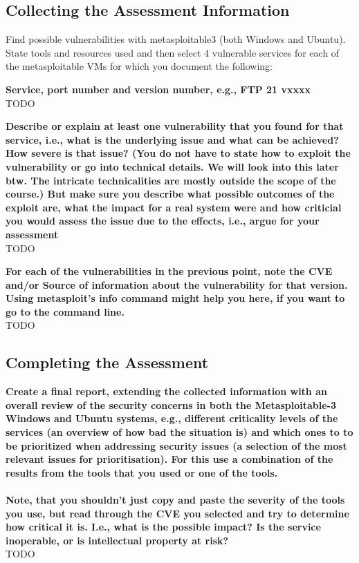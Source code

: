 \subsection*{Collecting the Assessment Information}
Find possible vulnerabilities with metasploitable3 (both Windows and Ubuntu).\\
State tools and resources used and then select 4 vulnerable services for each of the metasploitable VMs for which you document the following:

\textbf{\dag Service, port number and version number, e.g., FTP 21 vxxxx}\\
TODO

\textbf{\dag Describe or explain at least one vulnerability that you found for that service, i.e., what is the underlying issue and what can be achieved? How severe is that issue? (You do not have to state how to exploit the vulnerability or go into technical details. We will look into this later btw. The intricate technicalities are mostly outside the scope of the course.) But make sure you describe what possible outcomes of the exploit are, what the impact for a real system were and how criticial you would assess the issue due to the effects, i.e., argue for your assessment}\\
TODO

\textbf{\dag For each of the vulnerabilities in the previous point, note the CVE and/or Source of information about the vulnerability for that version. Using metasploit’s info command might help you here, if you want to go to the command line.}\\
TODO

\subsection*{Completing the Assessment}
\textbf{\dag
    Create a final report, extending the collected information with an overall review of the security concerns in both the Metasploitable-3 Windows and Ubuntu systems, e.g., different criticality levels of the services (an overview of how bad the situation is) and which ones to to be prioritized when addressing security issues (a selection of the most relevant issues for prioritisation). For this use a combination of the results from the tools that you used or one of the tools.\\\\
    Note, that you shouldn’t just copy and paste the severity of the tools you use, but read through the CVE you selected and try to determine how critical it is. I.e., what is the possible impact? Is the service inoperable, or is intellectual property at risk?}\\
TODO